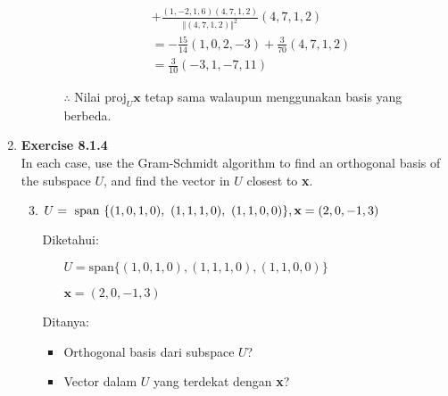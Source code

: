 \documentclass[12pt, a4paper]{scrartcl}
\begin{document}
\begin{enumerate}
\begin{enumerate}
\begin{align*}
                    \\ &+ \frac{(1,-2,1,6) (4,7,1,2)}{\Vert (4,7,1,2) \Vert^2} (4,7,1,2)
                    \\ &= -\frac{15}{14} (1,0,2,-3)+ \frac{3}{70}(4,7,1,2)
                    \\ &= \frac{3}{10}(-3,1,-7,11)
                \end{align*}
                \begin{itemize}
                    \item[$\therefore$] Nilai $\mbox{proj}_U \textbf{x}$ tetap sama walaupun menggunakan basis yang berbeda.
                \end{itemize}
                
            \end{enumerate}
            
            \item \textbf{Exercise 8.1.4}\\In each case, use the Gram-Schmidt algorithm to find an orthogonal basis of the subspace $U$, and find the vector in $U$ closest to \textbf{x}.
            \begin{enumerate}
                \setcounter{enumii}{2}
                \item $U = \mbox{ span } \{(1, 0, 1, 0), \mbox{ }(1, 1, 1, 0), \mbox{ }(1, 1, 0, 0)\},\\\textbf{x}=(2, 0, -1, 3)$
                
                Diketahui:
                \begin{itemize}
                    \item[] $U=\mbox{span}\{(1,0,1,0), (1,1,1,0), (1,1,0,0)\}$
                    \item[] $\textbf{x} = (2,0,-1,3)$
                \end{itemize}

                Ditanya:
                \begin{itemize}
                    \item Orthogonal basis dari subspace $U$?
                    \item Vector dalam $U$ yang terdekat dengan \textbf{x}?
                \end{itemize}
            

\end{enumerate}
\end{enumerate}
\end{document}
